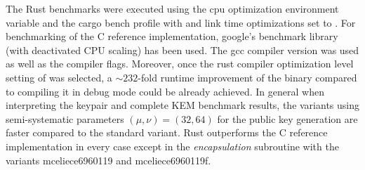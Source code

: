 \documentclass[11pt,
  oneside,openany,    %
]{scrreprt}
\begin{document}
The Rust benchmarks were executed using the cpu optimization environment variable  and the cargo bench profile with  and link time optimizations set to . For benchmarking of the C reference implementation, google's benchmark library~\cite{googleBenchmarkLib} (with deactivated CPU scaling) has been used. The gcc compiler version  was used as well as the  compiler flags.  Moreover, once the rust compiler optimization level setting of  was selected, a $\sim232$-fold runtime improvement of the binary compared to compiling it in debug mode could be already achieved. In general when interpreting the keypair and complete KEM benchmark results, the  variants using semi-systematic parameters $(\mu, \nu) = (32, 64)$ for the public key generation are faster compared to the standard variant.  Rust outperforms the C reference implementation in every case except in the \textit{encapsulation} subroutine with the variants mceliece6960119 and mceliece6960119f. 
\end{document}
